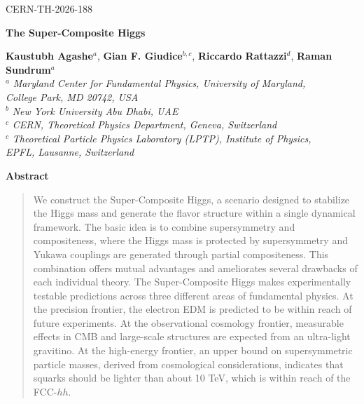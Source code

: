 \documentclass[a4paper,12pt]{article}
\begin{document}
{\hfill CERN-TH-2026-188}

\vspace{2cm}

\begin{center}
\boldmath

{\textbf{\LARGE The Super-Composite Higgs}}

\unboldmath

\bigskip

\vspace{1 truecm}

{\bf Kaustubh Agashe}$^a$, {\bf Gian F. Giudice}$^{b,c}$, {\bf Riccardo Rattazzi}$^d$, {\bf Raman Sundrum}$^a$
 \\[5mm]

$^a$ {\it Maryland Center for Fundamental Physics, University of Maryland, \\ College Park, MD 20742, USA}\\[2mm]
$^b$ {\it New York University Abu Dhabi, UAE}\\[2mm]
$^c$ {\it CERN, Theoretical Physics Department, Geneva, Switzerland}\\[2mm]
$^c$ {\it Theoretical Particle Physics Laboratory (LPTP), Institute of Physics, \\ EPFL, Lausanne, Switzerland}\\[2mm]
 


\vspace{2cm}

{\bf Abstract}
\end{center}

\begin{quote}
We construct the Super-Composite Higgs, a scenario designed to stabilize the Higgs mass and generate the flavor structure within a single dynamical framework. The basic idea is to combine supersymmetry and compositeness, where the Higgs mass is protected by supersymmetry and Yukawa couplings are generated through partial compositeness. This combination offers mutual advantages and ameliorates several drawbacks of each individual theory. The Super-Composite Higgs makes experimentally testable predictions across three different areas of fundamental physics. At the precision frontier, the electron EDM is predicted to be within reach of future experiments. At the observational cosmology frontier, measurable effects in CMB and large-scale structures are expected from an ultra-light gravitino. At the high-energy frontier, an upper bound on supersymmetric particle masses, derived from cosmological considerations, indicates that squarks should be lighter than about 10 TeV, which is within reach of the FCC-$hh$.


\end{quote}
\end{document}
